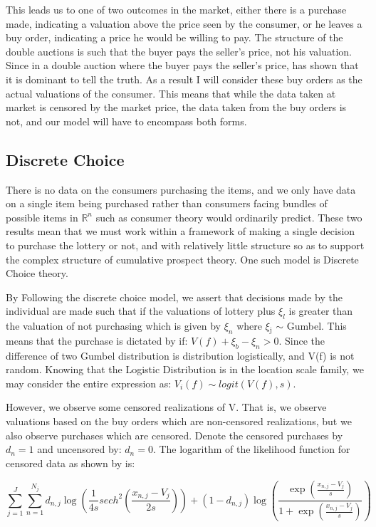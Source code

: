 \documentclass[12pt, letterpaper]{paper}
\begin{document}
This leads us to one of two outcomes in the market, either there is a
purchase made, indicating a valuation above the price seen by the
consumer, or he leaves a buy order, indicating a price he would be
willing to pay. The structure of the double auctions is such that the
buyer pays the seller's price, not his valuation. Since in a double
auction where the buyer pays the seller's price, \cite{PriceDataOnly}
has shown that it is dominant to tell the truth. As a result I will
consider these buy orders as the actual valuations of the
consumer. This means that while the data taken at market is censored
by the market price, the data taken from the buy orders is not, and
our model will have to encompass both forms.


\subsection{Discrete Choice}
\label{sec-2-2}
There is no data on the consumers purchasing the items, and we only
have data on a single item being purchased rather than consumers
facing bundles of possible items in $\mathbb{R}^n$ such as consumer
theory would ordinarily predict. These two results mean that we must
work within a framework of making a single decision to purchase the
lottery or not, and with relatively little structure so as to support
the complex structure of cumulative prospect theory. One such model is
Discrete Choice theory.

By Following the discrete choice model, we assert that decisions made
by the individual are made such that if the valuations of lottery plus
$\xi_l$ is greater than the valuation of not purchasing which is given
by $\xi_n$ where $\xi$$_{\text{j}}$ $\sim$ Gumbel. This means that the purchase is
dictated by if: $V(f) + \xi_b - \xi_n > 0$. Since the difference of
two Gumbel distribution is distribution logistically, and V(f) is not
random. Knowing that the Logistic Distribution is in the location
scale family, we may consider the entire expression as: $V_i(f) \sim
logit( V(f), s )$.

However, we observe some censored realizations of V. That is, we
observe valuations based on the buy orders which are non-censored
realizations, but we also observe purchases which are censored. Denote
the censored purchases by $d_n = 1$ and uncensored by: $d_n = 0$. The
logarithm of the likelihood function for censored data as shown by
\cite{LimeBoy} is:

\begin{equation}
\label{Likelihood}
\sum_{j=1}^J \sum_{n=1}^{N_j} d_{n,j} \log( \frac{1}{4s} sech^2 ( \frac{x_{n,j} - V_j}{2s} ) ) + (1-d_{n,j}) \log ( \frac{\exp(\frac{x_{n,j} - V_j}{s})}{1+\exp(\frac{x_{n,j} - V_j}{s})} )
\end{equation}
\end{document}
